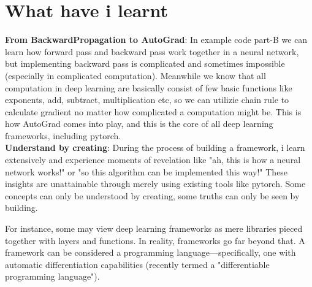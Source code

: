 \documentclass{article}
\newcommand{\secs}[1]{\section*{#1}}
\begin{document}
\secs{What have i learnt}
\noindent\textbf{From BackwardPropagation to AutoGrad}: In example code part-B we can learn how forward pass and backward pass work together in a neural network, but implementing backward pass is complicated and sometimes impossible (especially in complicated computation). Meanwhile we know that all computation in deep learning are basically consist of few basic functions like exponents, add, subtract, multiplication etc, so we can utilizie chain rule to calculate gradient no matter how complicated a computation might be. This is how AutoGrad comes into play, and this is the core of  all deep learning frameworks, including pytorch.\\

\noindent\textbf{Understand by creating}: During the process of building a framework, i learn extensively and experience moments of revelation like "ah, this is how a neural network works!" or "so this algorithm can be implemented this way!" These insights are unattainable through merely using existing tools like pytorch. Some concepts can only be understood by creating, some truths can only be seen by building. 

For instance, some may view deep learning frameworks as mere libraries pieced together with layers and functions. In reality, frameworks go far beyond that. A framework can be considered a programming language—specifically, one with automatic differentiation capabilities (recently termed a "differentiable programming language").
















\end{document}
